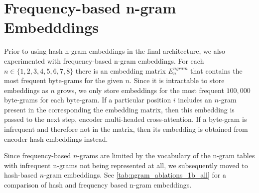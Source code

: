 \documentclass[]{fairmeta}
\begin{document}
\section{Frequency-based n-gram Embedddings}
\label{appendix:ngrams}
Prior to using hash n-gram embeddings in the final \model{} architecture, we also experimented with frequency-based n-gram embeddings. For each $n\in\{1,2,3,4,5,6,7,8\}$ there is an embedding matrix $E_{n}^{ngram}$ that contains the most frequent byte-grams for the given $n$.
Since it is intractable to store embeddings as $n$ grows, we only store embeddings for the most frequent $100,000$ byte-grams for each byte-gram.
If a particular position $i$ includes an $n$-gram present in the corresponding the embedding matrix, then this embedding is passed to the next step, encoder multi-headed cross-attention. If a byte-gram is infrequent and therefore not in the matrix, then its embedding is obtained from encoder hash embeddings instead.

Since frequency-based $n$-grams are limited by the vocabulary of the n-gram tables with infrequent n-grams not being represented at all, we subsequently moved to hash-based $n$-gram embeddings. See \autoref{tab:ngram_ablations_1b_all} for a comparison of hash and frequency based n-gram embeddings.
\end{document}
